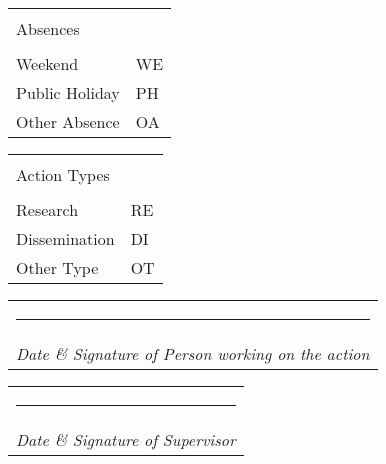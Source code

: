 \documentclass[a4paper]{article}
\makeatletter
\newcommand{\namesigdate}[2][5cm]{
  \begin{tabular}{@{}p{#1}@{}}
    \\[0pt]\hrule \\[0pt]
      {\normalsize \textit{Date \& Signature #2}}
  \end{tabular}
}
\makeatother
\begin{document}
\begin{minipage}[r]{0.2\textwidth}
  \vspace{8.2cm}
  \small{
    \begin{flushright}
      \begin{tabular}{ll}
        \hline\\
        \vspace{0.4pt}
        Absences &    \vspace{0.7pt}\\
        \hline\\
        \vspace{0.5pt}
        Weekend & WE  \\
        Public Holiday & PH   \\
        Other Absence & OA \\
        \hline
      \end{tabular}
    \end{flushright}

    \vspace{10pt}

    \begin{flushright}
      \begin{tabular}{ll}
        \hline\\
        \vspace{0.4pt}
        Action Types &  \vspace{0.7pt}\\
        \hline\\
        \vspace{0.5pt}
        Research & RE \\
        Dissemination & DI  \\
        Other Type & OT\\
        \hline
      \end{tabular}
    \end{flushright}
  }
\end{minipage}



\vfill

\noindent \namesigdate[8cm]{of Person working on the action} \hfill \namesigdate[6cm]{of Supervisor}
\end{document}
